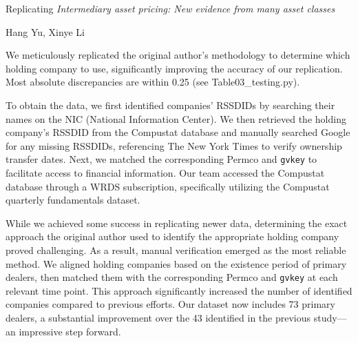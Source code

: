 {
\fontsize{18}{24}\selectfont
\textnormal{Replicating} \textit{Intermediary asset pricing: New evidence from many asset classes}
}

\bigskip

{
\fontsize{12}{14}\selectfont
Hang Yu, Xinye Li
}

We meticulously replicated the original author's methodology to determine which holding company to use, significantly improving the accuracy of our replication. Most absolute discrepancies are within 0.25 (see Table03\_testing.py).

\par
To obtain the data, we first identified companies' RSSDIDs by searching their names on the NIC (National Information Center). We then retrieved the holding company's RSSDID from the Compustat database and manually searched Google for any missing RSSDIDs, referencing The New York Times to verify ownership transfer dates. Next, we matched the corresponding Permco and \texttt{gvkey} to facilitate access to financial information. Our team accessed the Compustat database through a WRDS subscription, specifically utilizing the Compustat quarterly fundamentals dataset.

\par
While we achieved some success in replicating newer data, determining the exact approach the original author used to identify the appropriate holding company proved challenging. As a result, manual verification emerged as the most reliable method. We aligned holding companies based on the existence period of primary dealers, then matched them with the corresponding Permco and \texttt{gvkey} at each relevant time point. This approach significantly increased the number of identified companies compared to previous efforts. Our dataset now includes 73 primary dealers, a substantial improvement over the 43 identified in the previous study---an impressive step forward.
